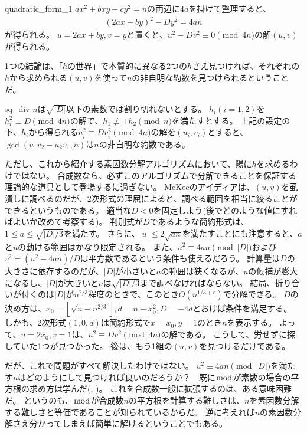 \begin{prProof}{quadratic_form_1}
$ax^2+bxy+cy^2=n$の両辺に$4a$を掛けて整理すると、
\begin{align*}
(2ax + by)^2 -Dy^2 = 4an
\end{align*}
が得られる。
$u=2ax + by, v=y$と置くと、$u^2 - Dv^2\equiv0\pmod{4n}$の解$(u,v)$が得られる。
\end{prProof}

1つの結論は、「$h$の世界」で本質的に異なる2つの$h$さえ見つければ、それぞれの$h$から求められる$(u,v)$を使って$n$の非自明な約数を見つけられるということだ。

\begin{Prop}{}{sq_div}
$n$は$\sqrt{|D|}$以下の素数では割り切れないとする。
$h_i(i=1,2)$を$h_i^2\equiv D\pmod{4n}$の解で、$h_1\not\equiv\pm h_2\pmod{n}$を満たすとする。
上記の設定の下、$h_i$から得られる$u_i^2 \equiv Dv_i^2 \pmod{4n}$の解を$(u_i,v_i)$とすると、$\gcd(u_1v_2 - u_2v_1, n)$は$n$の非自明な約数である。
\end{Prop}

ただし、これから紹介する素因数分解アルゴリズムにおいて、陽に$h$を求めるわけではない。
合成数なら、必ずこのアルゴリズムで分解できることを保証する理論的な道具として登場するに過ぎない。
McKee\cite{10.1112/blms/28.4.351}のアイディアは、$(u,v)$を虱潰しに調べるのだが、2次形式の理屈によると、調べる範囲を相当に絞ることができるというものである。
適当な$D<0$を固定しよう(後でどのような値にすればよいか改めて考察する)。
判別式が$D$であるような簡約形式は、$1\le a\le\sqrt{|D|/3}$を満たす。
さらに、$|u|\le2\sqrt{an}$を満たすことにも注意すると、$a$と$u$の動ける範囲はかなり限定される。
また、$u^2\equiv4an\pmod{|D|}$および$v^2=(u^2-4an)/D$は平方数であるという条件も使えるだろう。
計算量は$D$の大きさに依存するのだが、$|D|$が小さいと$a$の範囲は狭くなるが、$u$の候補が膨大になるし、$|D|$が大きいと$a$は$\sqrt{|D|/3}$まで調べなければならない。
結局、折り合いが付くのは$|D|$が$n^{2/3}$程度のときで、このとき$O(n^{1/3+\epsilon})$で分解できる。
$D$の決め方は、$x_0=\left \lfloor \sqrt{n-n^{2/3}} \right \rfloor, d=n-x_0^2, D=-4d$とおけば条件を満足する。
しかも、2次形式$(1,0,d)$は簡約形式で$x=x_0,y=1$のとき$n$を表示する。
よって、$u=2x_0,v=1$は、$u^2 \equiv Dv^2 \pmod{4n}$の解である。
こうして、労せずに探していた1つが見つかった。
後は、もう1組の$(u,v)$を見つけるだけである。

だが、これで問題がすべて解決したわけではない。
$u^2\equiv4an\pmod{|D|}$を満たす$u$はどのようにして見つければ良いのだろうか？　既に$\bmod$が素数の場合の平方根の求め方は学んだ(, )。
これを合成数一般に拡張するのは、ある意味困難だ。
というのも、$\bmod$が合成数$n$の平方根を計算する難しさは、$n$を素因数分解する難しさと等価であることが知られているからだ。
逆に考えれば$n$の素因数分解さえ分かってしまえば簡単に解けるということでもある。

